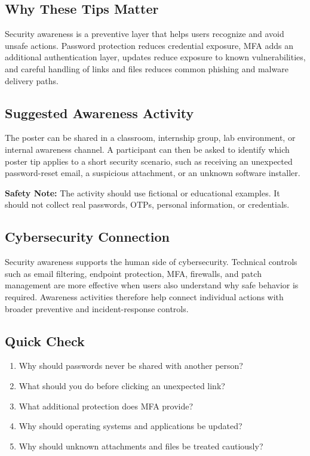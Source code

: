 \documentclass[12pt,a4paper]{article}
\begin{document}
\subsection{Why These Tips Matter}

Security awareness is a preventive layer that helps users recognize and avoid unsafe actions. Password protection reduces credential exposure, MFA adds an additional authentication layer, updates reduce exposure to known vulnerabilities, and careful handling of links and files reduces common phishing and malware delivery paths.

\subsection{Suggested Awareness Activity}

The poster can be shared in a classroom, internship group, lab environment, or internal awareness channel. A participant can then be asked to identify which poster tip applies to a short security scenario, such as receiving an unexpected password-reset email, a suspicious attachment, or an unknown software installer.

\textbf{Safety Note:} The activity should use fictional or educational examples. It should not collect real passwords, OTPs, personal information, or credentials.

\subsection{Cybersecurity Connection}

Security awareness supports the human side of cybersecurity. Technical controls such as email filtering, endpoint protection, MFA, firewalls, and patch management are more effective when users also understand why safe behavior is required. Awareness activities therefore help connect individual actions with broader preventive and incident-response controls.

\subsection{Quick Check}

\begin{enumerate}
    \item Why should passwords never be shared with another person?
    \item What should you do before clicking an unexpected link?
    \item What additional protection does MFA provide?
    \item Why should operating systems and applications be updated?
    \item Why should unknown attachments and files be treated cautiously?
\end{enumerate}
\end{document}
